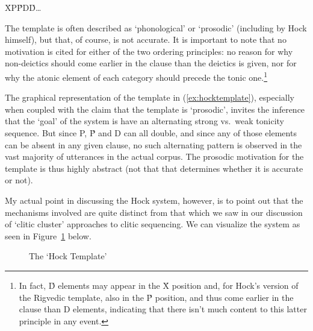 \documentclass[output=paper,
modfonts
]{LSP/langsci}
\begin{document}
\begin{exe}
	\ex\label{ex:hocktemplate}\'{X}\hspace{.25in}P\hspace{.25in}\'{P}\hspace{.25in}D\hspace{.25in}\'{D}\hspace{.25in}\ldots\
\end{exe}

\noindent The template is often described as `phonological'
or `prosodic' (including by Hock himself), but that, of course, is not accurate. It is important to note that no motivation is cited for either of the two ordering
principles: no reason for why non-deictics should come earlier in the clause than the deictics
is given, nor for why the atonic element of each category should precede the tonic one.\footnote{In fact,
\'{D} elements may appear in the \'{X} position and, for Hock's version of the Rigvedic\is{Rigveda} template,
also in the \'{P} position, and thus come earlier in the clause than D elements,
indicating that there isn't much content to this latter principle in
any event.}

The graphical representation of the template in (\ref{ex:hocktemplate}), especially when coupled with the
claim that the template is `prosodic', invites the inference that the `goal' of the system is have an alternating
strong vs.\ weak tonicity sequence. But since P, \'{P} and D can all double, and since any of those elements can
be absent in any given clause, no such alternating pattern is observed in the vast majority of utterances
in the actual corpus. The prosodic motivation for the template is thus highly abstract (not that that determines
whether it is accurate or not).

My actual point in discussing the Hock system, however, is to point out that the mechanisms involved are quite distinct from that which we saw in
our discussion of `clitic cluster' approaches to clitic sequencing. We can visualize the system as
seen in Figure~\ref{Halefigure2} below.%

\begin{figure}%
\begin{center}
\end{center}
\caption{The `Hock Template'}\label{Halefigure2}
\end{figure}
\end{document}
